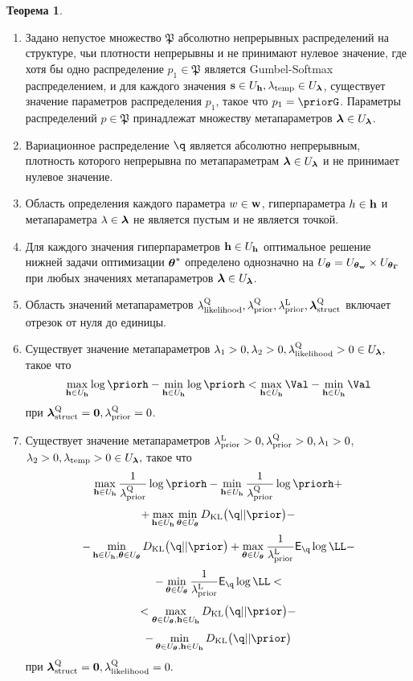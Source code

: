 \documentclass[11pt, a5paper]{dissert}
\theoremstyle{definition}
\newtheorem{theorem}{Теорема}
\begin{document}
{\begin{theorem}
\begin{enumerate}
\item Задано непустое множество  $\mathfrak{P}$ абсолютно непрерывных распределений на структуре, чьи плотности непрерывны и не принимают нулевое значение, где хотя бы одно распределение $p_1 \in \mathfrak{P}$ является Gumbel-Softmax распределением, и для каждого значения $\mathbf{s} \in U_{\mathbf{h}}, \lambda_{\text{temp}} \in U_{\boldsymbol{\lambda}}$, существует значение параметров распределения $p_1$, такое что $p_1 = \priorG$. Параметры распределений $p \in \mathfrak{P}$ принадлежат множеству метапараметров $\boldsymbol{\lambda} \in U_{\boldsymbol{\lambda}}$.

\item Вариационное распределение $\q$ является  абсолютно непрерывным, плотность которого непрерывна по метапараметрам $\boldsymbol{\lambda} \in U_{\boldsymbol{\lambda}}$ и не принимает нулевое значение.

\item Область определения каждого параметра $w \in\mathbf{w}$, гиперпараметра $h \in \mathbf{h}$ и метапараметра $\lambda \in \boldsymbol{\lambda}$ не является пустым и не является точкой.

\item Для каждого значения гиперпараметров $\mathbf{h} \in U_{\mathbf{h}}$ оптимальное решение нижней задачи оптимизации $\boldsymbol{\theta}^{*}$ определено однозначно на $U_{\boldsymbol{\theta}} = U_{\boldsymbol{\theta}_\mathbf{w}} \times U_{\boldsymbol{\theta}_{\boldsymbol{\Gamma}}}$ при любых значениях метапараметров $\boldsymbol{\lambda} \in U_{\boldsymbol{\lambda}}$.

\item Область значений метапараметров $\lambda_\text{likelihood}^\text{Q}, \lambda_\text{prior}^\text{Q}, \lambda_\text{prior}^\text{L}, \boldsymbol{\lambda}_\text{struct}^\text{Q}$ включает отрезок от нуля до единицы.

\item Существует значение метапараметров $\lambda_1>0, \lambda_2>0, \lambda_\text{likelihood}^\text{Q}>0  \in U_{\boldsymbol{\lambda}},$ такое что
\[
\max_{\h \in \Uh} \log \priorh -\min_{\h \in \Uh}\log \priorh < \max_{\h \in \Uh} \Val - \min_{\h \in \Uh} \Val
\] 
при $\boldsymbol{\lambda}_\text{struct}^\text{Q} = \mathbf{0}, \lambda_\text{prior}^\text{Q} = 0$.

\item Существует значение метапараметров $\lambda_\text{prior}^\text{L}>0, \lambda_\text{prior}^\text{Q}>0, \lambda_1>0$, $\lambda_2>0, \lambda_{\text{temp}}>0 \in U_{\boldsymbol{\lambda}},$ такое что 
\[
    \max_{\h \in \Uh} \frac{1}{\lamCQ}\log  \priorh - \min_{\h \in \Uh} \frac{1}{\lamCQ}\log  \priorh +
\]
\[
 + \max_{\h \in \Uh} \min_{\teta \in \Uteta} \KL{\q}{\prior} -
\]
\[ -\min_{\h \in \Uh, \teta \in \Uteta}  \KL{\q}{\prior} + \max_{\teta \in \Uteta}\frac{1}{\lamCL}\E_{\q} \log \LL - 
\]
\[
 - \min_{\teta \in \Uteta}\frac{1}{\lamCL}\E_{\q} \log \LL  <
\]
\[ 
< \max_{\teta \in \Uteta, \h \in \Uh} \KL{\q}{\prior} -
\]
\[
-\min_{\teta \in \Uteta, \h \in \Uh} \KL{\q}{\prior}
\]
при $\boldsymbol{\lambda}_\text{struct}^\text{Q} = \mathbf{0}, \lambda_\text{likelihood}^\text{Q} = 0.$


\end{enumerate}
\end{theorem}}
\end{document}
